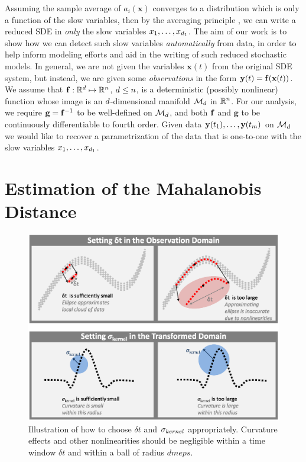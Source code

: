 Assuming the sample average of $a_i(\mathbf{x})$ converges to a distribution which is only a function of the slow variables, then by the averaging principle \cite{freidlin2012random}, we can write a reduced SDE in {\em only} the slow variables $x_1, \dots, x_{{d_1}}$.
%
The aim of our work is to show how we can detect such slow variables {\em automatically} from data, in order to help inform modeling efforts and aid in the writing of such reduced stochastic models.
%
In general, we are not given the variables $\mathbf{x}(t)$ from the original SDE system, but instead, we are given some {\em observations}
 in the form $\mathbf{y}(t) = \mathbf{f} (\mathbf{x}(t))$.
%
We assume that $\mathbf{f}: \mathbb{R}^d \mapsto \mathbb{R}^n$, $d \le n$, is a deterministic (possibly nonlinear) function whose image is an $d$-dimensional manifold $\mathcal{M}_d$ in $\mathbb{R}^n$.
%
%
For our analysis, we require $\mathbf{g} = \mathbf{f} ^{-1}$ to be well-defined on $\mathcal{M}_d$, and both $\mathbf{f}$ and $\mathbf{g}$ to be continuously differentiable to fourth order.
%
Given data $\mathbf{y}(t_1),\ldots,\mathbf{y}(t_m)$ on $\mathcal{M}_d$ we would like to recover a parametrization of the data that is one-to-one with the
slow variables $x_1, \dots, x_{d_1}$.

\section{Estimation of the Mahalanobis Distance} \label{sec:analysis}

\begin{figure}[t]
\centering
\includegraphics[width=\textwidth]{schematic}
\caption[Schematic of analysis parameters for multiscale data]{Illustration of how to choose $\delta t$ and $\sigma_{kernel}$ appropriately. 	Curvature effects and other nonlinearities should be negligible within a time window $\delta t$ and within a ball of radius $dmeps$.}
\label{fig:schematic}
\end{figure}


